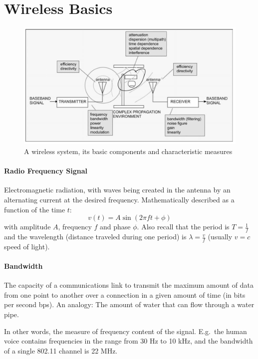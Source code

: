 \section{Wireless Basics}

\begin{figure}[h]
	\centering
	\includegraphics[scale=0.4]{images/1-wireless-system.png}
	\caption{A wireless system, its basic components and characteristic measures}%
	\label{fig:wireless-system}
\end{figure}

\paragraph{Radio Frequency Signal}
Electromagnetic radiation, with waves being created in the antenna by an alternating current at the desired frequency.
Mathematically described as a function of the time $t$:
\[ v(t) = A \sin (2 \pi f t + \phi) \]
with amplitude $A$, frequency $f$ and phase $\phi$.
Also recall that the period is $T = \frac{1}{f}$ and the wavelength (distance traveled during one period) is $\lambda = \frac{v}{f}$ (usually $v=c$ speed of light).

\paragraph{Bandwidth}
The capacity of a communications link to transmit the maximum amount of data from one point to another over a connection in a given amount of time (in bits per second bps).
An analogy: The amount of water that can flow through a water pipe.

In other words, the measure of frequency content of the signal.
E.g.\ the human voice contains frequencies in the range from 30 Hz to 10 kHz, and the bandwidth of a single 802.11 channel is 22 MHz.

